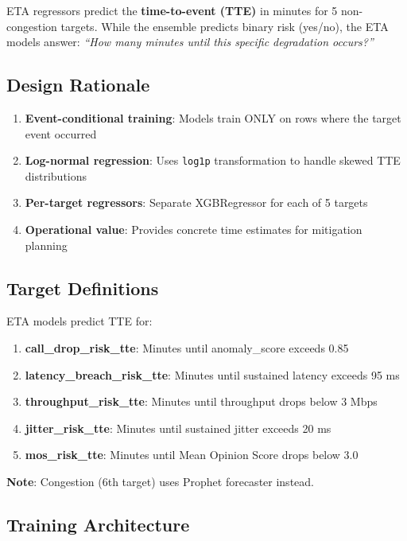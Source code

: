 \documentclass[11pt,a4paper,oneside]{report}
\begin{document}
ETA regressors predict the \textbf{time-to-event (TTE)} in minutes for 5 non-congestion targets. While the ensemble predicts binary risk (yes/no), the ETA models answer: \textit{``How many minutes until this specific degradation occurs?''}

\subsection{Design Rationale}

\begin{enumerate}
    \item \textbf{Event-conditional training}: Models train ONLY on rows where the target event occurred
    \item \textbf{Log-normal regression}: Uses \texttt{log1p} transformation to handle skewed TTE distributions
    \item \textbf{Per-target regressors}: Separate XGBRegressor for each of 5 targets
    \item \textbf{Operational value}: Provides concrete time estimates for mitigation planning
\end{enumerate}

\subsection{Target Definitions}

ETA models predict TTE for:

\begin{enumerate}
    \item \textbf{call\_drop\_risk\_tte}: Minutes until anomaly\_score exceeds 0.85
    \item \textbf{latency\_breach\_risk\_tte}: Minutes until sustained latency exceeds 95 ms
    \item \textbf{throughput\_risk\_tte}: Minutes until throughput drops below 3 Mbps
    \item \textbf{jitter\_risk\_tte}: Minutes until sustained jitter exceeds 20 ms
    \item \textbf{mos\_risk\_tte}: Minutes until Mean Opinion Score drops below 3.0
\end{enumerate}

\textbf{Note}: Congestion (6th target) uses Prophet forecaster instead.

\subsection{Training Architecture}
\end{document}
